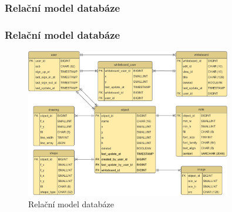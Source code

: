 \documentclass{beamer}
\begin{document}
\subsubsection{Relační model databáze}
\begin{frame}
    \frametitle{Relační model databáze}
    \begin{figure}
        \centering
        \includegraphics[width=0.8\textwidth]{Figures/EntityRelationshipDiagram.pdf}
        \caption{Relační model databáze}
    \end{figure}
\end{frame}
\end{document}
